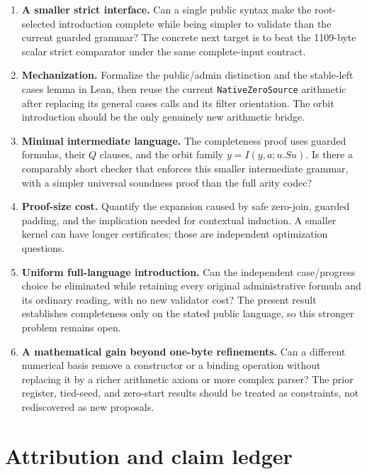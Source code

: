 \documentclass[11pt,letterpaper]{article}
\theoremstyle{definition}\newtheorem{definition}[theorem]{Definition}
\theoremstyle{remark}\newtheorem{remark}[theorem]{Remark}
\newcommand{\file}[1]{{\small\nolinkurl{#1}}}
\begin{document}
\begin{enumerate}
\item \textbf{A smaller strict interface.} Can a single public syntax make
      the root-selected introduction complete while being simpler to
      validate than the current guarded grammar? The concrete next target
      is to beat the 1109-byte scalar strict comparator under the same
      complete-input contract.
\item \textbf{Mechanization.} Formalize the public/admin distinction and
      the stable-left cases lemma in Lean, then reuse the current
      \file{NativeZeroSource} arithmetic after replacing its general cases
      calls and its filter orientation. The orbit introduction should be
      the only genuinely new arithmetic bridge.
\item \textbf{Minimal intermediate language.} The completeness proof uses
      guarded formulas, their $Q$ clauses, and the orbit family
      $y=I(y,a;u.Su)$. Is there a comparably short checker that enforces this
      smaller intermediate grammar, with a simpler universal soundness
      proof than the full arity codec?
\item \textbf{Proof-size cost.} Quantify the expansion caused by safe
      zero-join, guarded padding, and the implication needed for contextual
      induction. A smaller kernel can have longer certificates; those are
      independent optimization questions.
\item \textbf{Uniform full-language introduction.} Can the independent
      case/progress choice be eliminated while retaining every original
      administrative formula and its ordinary reading, with no new
      validator cost? The present result establishes completeness only on
      the stated public language, so this stronger problem remains open.
\item \textbf{A mathematical gain beyond one-byte refinements.} Can a
      different numerical basis remove a constructor or a binding operation
      without replacing it by a richer arithmetic axiom or more complex
      parser? The prior register, tied-seed, and zero-start results should
      be treated as constraints, not rediscovered as new proposals.
\end{enumerate}

\section*{Attribution and claim ledger}
\end{document}
